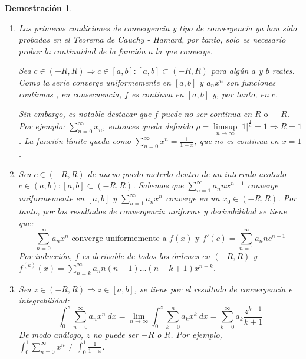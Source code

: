\documentclass[10pt,a4paper,openright]{book}
\theoremstyle{break}
\newtheorem*{demo}{\underline{Demostración}}
\newcommand{\dif}[1]{\ d#1}
\begin{document}
\begin{demo}
\begin{enumerate}
\item Las primeras condiciones de convergencia y tipo de convergencia ya han sido probadas en el Teorema de Cauchy - Hamard, por tanto, solo es necesario probar la continuidad de la función a la que converge.

Sea $c \in (-R, R)\Rightarrow c\in [a,b] : [a,b] \subset (-R, R)$ para algún $a$ y $b$ reales. Como la serie converge uniformemente en $[a,b]$ y $a_n x^n$  son funciones continuas , en consecuencia, $f$ es continua en $[a,b]$ y, por tanto, en $c$.

Sin embargo, es notable destacar que $f$ puede no ser continua en $R \mbox{ o } -R$. Por ejemplo: $\sum_{n=0}^{\infty} x_n$, entonces queda definido $\rho = \underset{n \to \infty}\limsup |1|^{\frac{1}{n}} = 1 \Rightarrow R=1$. La función límite queda como $\sum_{n=0}^{\infty} x^n= \frac{1}{1-x}$, que no es continua en $x=1$.

\item Sea $c \in (-R, R)$ de nuevo puedo meterlo dentro de un intervalo acotado $c \in (a,b) : [a,b] \subset (-R, R)$. Sabemos que $\sum_{n=1}^{\infty} a_n n x^{n-1}$ converge uniformemente en $[a,b]$ y $\sum_{n=1}^{\infty} a_n x^n$ converge en un $x_0 \in (-R, R)$. Por tanto, por los resultados de convergencia uniforme y derivabilidad se tiene que:
$$\sum_{n=0}^{\infty} a_n x^n \mbox{ converge uniformemente a } f(x) \mbox{ y } f'(c) = \sum_{n=1}^{\infty} a_n n c^{n-1}$$
Por inducción, $f$ es derivable de todos los órdenes en $(-R, R)$ y $f^{(k)}(x) = \sum_{n = k}^{\infty} a_n n (n-1) \ldots (n- k + 1) x^{n-k}$.

\item Sea $z\in (-R,R)\Rightarrow z\in [a,b]$, se tiene por el resultado de convergencia e integrabilidad:
$$\int_{0}^{z} \sum_{n=0}^{\infty} a_n x^n \dif{x} = \lim_{n \to \infty} \int_{0}^{z} \sum_{k=0}^{n} a_k x^k \dif{x} = \sum_{k=0}^{\infty} a_k \frac{z^{k+1}}{k+1}$$
De modo análogo, $z$ no puede ser $-R$ o $R$. Por ejemplo, $\int_{0}^{1} \sum_{n=0}^{\infty} x^n \neq \int_{0}^{1} \frac{1}{1-x}$.
\end{enumerate}
\end{demo}
\end{document}
